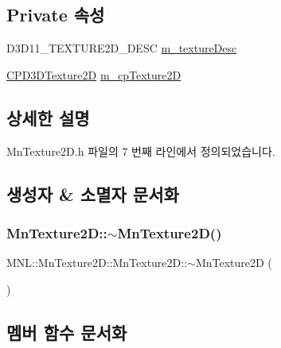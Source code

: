 \subsection*{Private 속성}
\begin{DoxyCompactItemize}
\item 
D3\+D11\+\_\+\+T\+E\+X\+T\+U\+R\+E2\+D\+\_\+\+D\+E\+SC \hyperlink{class_m_n_l_1_1_mn_texture2_d_a95de966ea71313ea1bbf7b199ca0488c}{m\+\_\+texture\+Desc}
\item 
\hyperlink{namespace_m_n_l_addb538e1cbd1f443e6db5e6312487c51}{C\+P\+D3\+D\+Texture2D} \hyperlink{class_m_n_l_1_1_mn_texture2_d_a8022c07cf05428dafeb35f9fd0035c37}{m\+\_\+cp\+Texture2D}
\end{DoxyCompactItemize}


\subsection{상세한 설명}


Mn\+Texture2\+D.\+h 파일의 7 번째 라인에서 정의되었습니다.



\subsection{생성자 \& 소멸자 문서화}
\mbox{\label{class_m_n_l_1_1_mn_texture2_d_a74b4bb846168d1763009e09652585edd}} 
\subsubsection{\texorpdfstring{Mn\+Texture2\+D\+::$\sim$\+Mn\+Texture2\+D()}{MnTexture2D::~MnTexture2D()}}
{\footnotesize\ttfamily M\+N\+L\+::\+Mn\+Texture2\+D\+::\+Mn\+Texture2\+D\+::$\sim$\+Mn\+Texture2D (\begin{DoxyParamCaption}{ }\end{DoxyParamCaption})}



\subsection{멤버 함수 문서화}
\mbox{\label{class_m_n_l_1_1_mn_texture2_d_aa74bb278ccb47dc102d692d67c6f856a}} 
